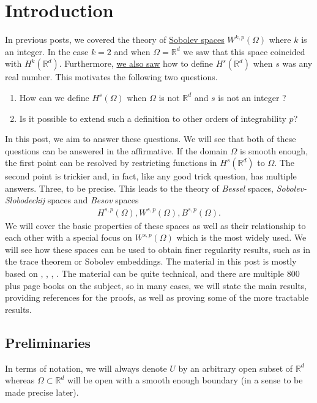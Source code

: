 \documentclass[
    a4paper,
    DIV=14,
    abstract=true,
    numbers=noenddot
]
{scrartcl}
\theoremstyle{definition}
\newcommand{\R}{\mathbb{R}}
\begin{document}
\section{Introduction}
In previous posts, we covered the theory of \href{https://nowheredifferentiable.com/2023-07-12-PDEs-3-Sobolev_spaces/}{Sobolev spaces} $W^{k,p}(\Omega )$ where $k$ is an integer. In the case $k=2$ and when $\Omega =\R^d$ we saw that this space coincided with $H^k(\R^d)$. Furthermore, \href{https://nowheredifferentiable.com/2023-01-29-PDE-1-Fourier/}{we also saw} how to define $H^s(\R^d)$ when $s$ was any real number. This motivates the following two questions.
\begin{enumerate}
    \item How can we define $H^s(\Omega )$  when $\Omega $ is not $\R^d$ and $s$ is not an integer ?
    \item Is it possible to extend such a definition to other orders of integrability $p$?
\end{enumerate}
In this post, we aim to answer these questions. We will see that both of these questions can be answered in the affirmative. If the domain $\Omega $  is smooth enough, the first point can be resolved by restricting functions in $H^s(\R^d)$ to $\Omega $. The second point is trickier and, in fact, like any good trick question, has multiple answers. Three, to be precise. This leads to the theory of \emph{Bessel} spaces, \emph{Sobolev-Slobodeckij} spaces and \emph{Besov} spaces
\begin{align*}
    H^{s,p}(\Omega ),W^{s,p}(\Omega ),B^{s,p}(\Omega ).
\end{align*}
We will cover the basic properties of these spaces as well as their relationship to each other with a special focus on $W^{s,p}(\Omega )$ which is the most widely used.  We will see how these spaces can be used to obtain finer regularity results, such as in the trace theorem or Sobolev embeddings. The material in this post is mostly based on \cite{leoni2023first}, \cite{agranovich2015sobolev}, \cite{di2012hitchhikers}, \cite{triebel1992theory}. The material can be quite technical, and there are multiple $800$ plus page books on the subject, so in many cases, we will state the main results, providing references for the proofs, as well as proving some of the more tractable results.
\subsection{Preliminaries}
In terms of notation, we will always denote $U$ by an arbitrary open subset of $\R^d$  whereas $\Omega \subset \R^d $ will be open with a smooth enough boundary (in a sense to be made precise later).
\end{document}
